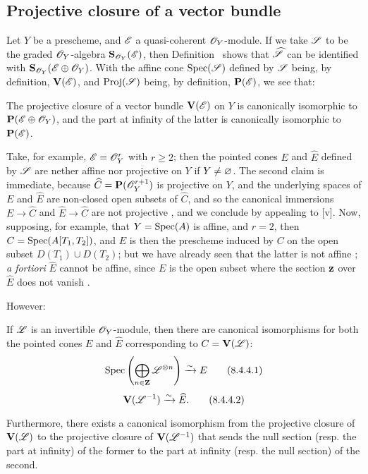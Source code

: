 \subsection{Projective closure of a vector bundle}
\label{subsection:II.8.4}

\begin{env}[8.4.1]
\label{II.8.4.1}
Let $Y$ be a prescheme, and $\mathscr{E}$ a quasi-coherent $\mathscr{O}_Y$-module.
If we take $\mathscr{S}$ to be the graded $\mathscr{O}_Y$-algebra $\mathbf{S}_{\mathscr{O}_Y}(\mathscr{E})$, then Definition~ shows that $\widehat{\mathscr{S}}$ can be identified with $\mathbf{S}_{\mathscr{O}_Y}(\mathscr{E}\oplus\mathscr{O}_Y)$.
With the affine cone $\operatorname{Spec}(\mathscr{S})$ defined by $\mathscr{S}$ being, by definition, $\mathbf{V}(\mathscr{E})$, and $\operatorname{Proj}(\mathscr{S})$ being, by definition, $\mathbf{P}(\mathscr{E})$, we see that:
\end{env}
\begin{proposition}[8.4.2]
\label{II.8.4.2}
The projective closure of a vector bundle $\mathbf{V}(\mathscr{E})$ on $Y$ is canonically isomorphic to $\mathbf{P}(\mathscr{E}\oplus\mathscr{O}_Y)$, and the part at infinity of the latter is canonically isomorphic to $\mathbf{P}(\mathscr{E})$.
\end{proposition}

\begin{remark}[8.4.3]
\label{II.8.4.3}
Take, for example, $\mathscr{E}=\mathscr{O}_Y^r$ with $r\geq2$;
then the pointed cones $E$ and $\widehat{E}$ defined by $\mathscr{S}$ are nether affine nor projective on $Y$ if $Y\neq\varnothing$.
The second claim is immediate, because $\widehat{C}=\mathbf{P}(\mathscr{O}_Y^{r+1})$ is projective on $Y$, and the underlying spaces of $E$ and $\widehat{E}$ are non-closed open subsets of $\widehat{C}$, and so the canonical immersions $E\to\widehat{C}$ and $\widehat{E}\to\widehat{C}$ are not projective , and we conclude by appealing to [v].
Now, supposing, for example, that $Y=\operatorname{Spec}(A)$ is affine, and $r=2$, then $C=\operatorname{Spec}(A[T_1,T_2])$, and $E$ is then the prescheme induced by $C$ on the open subset $D(T_1)\cup D(T_2)$;
but we have already seen that the latter is not affine ;
\emph{a fortiori} $\widehat{E}$ cannot be affine, since $E$ is the open subset where the section $\mathbf{z}$ over $\widehat{E}$ does not vanish .

However:
\end{remark}
\begin{proposition}[8.4.4]
\label{II.8.4.4}
If $\mathscr{L}$ is an invertible $\mathscr{O}_Y$-module, then there are canonical isomorphisms for both the pointed cones $E$ and $\widehat{E}$ corresponding to $C=\mathbf{V}(\mathscr{L})$:
\[
\label{eq:2.8.4.4.1}
  \operatorname{Spec}\left(
    \bigoplus_{n\in\mathbf{Z}}\mathscr{L}^{\otimes n}
  \right)
  \xrightarrow{\sim}
  E
\tag{8.4.4.1}
\]
\[
\label{eq:2.8.4.4.2}
  \mathbf{V}(\mathscr{L}^{-1})
  \xrightarrow{\sim}
  \widehat{E}.
\tag{8.4.4.2}
\]

Furthermore, there exists a canonical isomorphism from the projective closure of $\mathbf{V}(\mathscr{L})$ to the projective closure of $\mathbf{V}(\mathscr{L}^{-1})$ that sends the null section (resp. the part at infinity) of the former to the part at infinity (resp. the null section) of the second.
\end{proposition}

